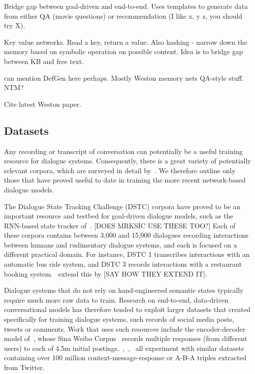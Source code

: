 \documentclass[11pt,letterpaper]{article}
\begin{document}
\cite{dodge2015evaluating} Bridge gap between goal-driven and end-to-end. Uses templates to generate data from either QA (movie questions) or recommendation (I like x, y z, you should try X). 



\cite{miller2016key} Key value networks. Read a key, return a value. Also hashing - narrow down the memory based on symbolic operation on possible content. Idea is to bridge gap between KB and free text. 

can mention DefGen here perhaps. Mostly Weston memory nets QA-style stuff. NTM? 

Cite latest Weston paper.

\subsection{Datasets}
Any recording or transcript of conversation can potentially be a useful training resource for dialogue systems. Consequently, there is a great variety of potentially relevant corpora, which are surveyed in detail by~\cite{serban2015survey}. We therefore outline only those that have proved useful to date in training the more recent network-based dialogue models.

The Dialogue State Tracking Challenge (DSTC) corpora have proved to be an important resource and testbed for goal-driven dialogue models, such as the RNN-based state tracker of~. [DOES MRKSIC USE THESE TOO?] Each of these corpora contains between 3,000 and 15,000 dialogues recording interactions between humans and rudimentary dialogue systems, and each is focused on a different practical domain. For instance, DSTC 1 transcribes interactions with an automatic bus ride system, and DSTC 3 records interactions with a restaurant booking system.~\cite{wen2015semantically} extend this by [SAY HOW THEY EXTEND IT].  

Dialogue systems that do not rely on hand-engineered semantic states typically require much more raw data to train. Research on end-to-end, data-driven conversational models has therefore tended to exploit larger datasets that created specifically for training dialogue systems, such records of social media posts, tweets or comments. Work that uses such resources include the encoder-decoder model of~\cite{shang2015neural}, whose Sina Weibo Corpus~\cite{shang2015neural} records multiple responses (from different users) to each of 4.5m initial postings.~,~,~ all experiment with similar datasets containing over 100 million context-message-response or A-B-A triples extracted from Twitter. 
\end{document}
